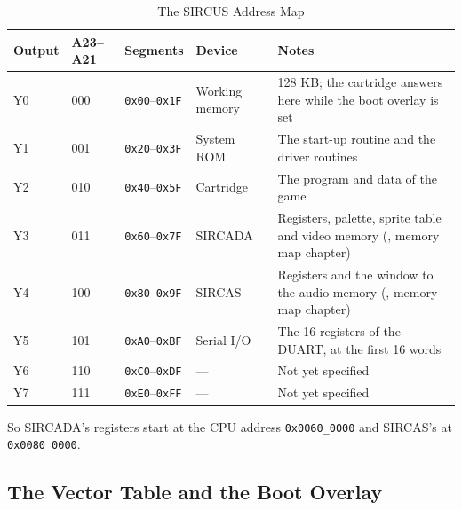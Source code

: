 \begin{table}[H]
	\centering
	\begin{tabular}{llllp{4.6cm}}
		\toprule
		\textbf{Output} & \textbf{A23--A21} & \textbf{Segments}            & \textbf{Device} & \textbf{Notes}                                                                         \\
		\midrule
		Y0              & 000               & \texttt{0x00}--\texttt{0x1F} & Working memory  & 128 KB; the cartridge answers here while the boot overlay is set                       \\
		Y1              & 001               & \texttt{0x20}--\texttt{0x3F} & System ROM      & The start-up routine and the driver routines                                           \\
		Y2              & 010               & \texttt{0x40}--\texttt{0x5F} & Cartridge       & The program and data of the game                                                       \\
		Y3              & 011               & \texttt{0x60}--\texttt{0x7F} & SIRCADA         & Registers, palette, sprite table and video memory (\videomanual{}, memory map chapter) \\
		Y4              & 100               & \texttt{0x80}--\texttt{0x9F} & SIRCAS          & Registers and the window to the audio memory (\audiomanual{}, memory map chapter)      \\
		Y5              & 101               & \texttt{0xA0}--\texttt{0xBF} & Serial I/O      & The 16 registers of the DUART, at the first 16 words                                   \\
		Y6              & 110               & \texttt{0xC0}--\texttt{0xDF} & ---             & Not yet specified                                                                      \\
		Y7              & 111               & \texttt{0xE0}--\texttt{0xFF} & ---             & Not yet specified                                                                      \\
		\bottomrule
	\end{tabular}
	\caption{The SIRCUS Address Map}
	\label{tab:address-map}
\end{table}

So SIRCADA's registers start at the CPU address \texttt{0x0060\_0000} and SIRCAS's at \texttt{0x0080\_0000}.

\subsection{The Vector Table and the Boot Overlay}
\label{sec:boot-overlay}


